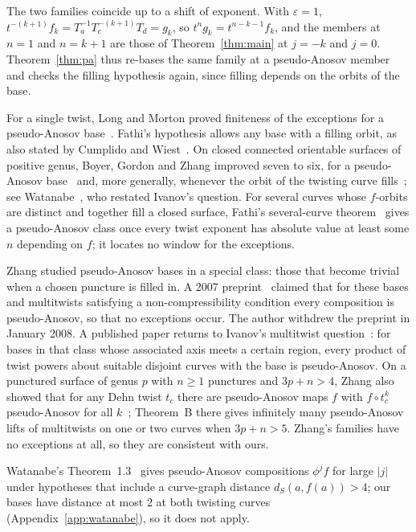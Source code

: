 \documentclass[11pt]{article}
\theoremstyle{remark}
\begin{document}
The two families coincide up to a shift of exponent. With
$\varepsilon=1$, $t^{-(k+1)}f_k=T_a^{-1}T_c^{-(k+1)}T_d=g_k$, so
$t^ng_k=t^{n-k-1}f_k$, and the members at $n=1$ and $n=k+1$ are those of
Theorem~\ref{thm:main} at $j=-k$ and $j=0$. Theorem~\ref{thm:pa} thus
re-bases the same family at a pseudo-Anosov member and checks the filling
hypothesis again, since filling depends on the orbits of the base.

For a single twist, Long and Morton proved finiteness of the exceptions
for a pseudo-Anosov base~\cite[Theorem~A]{LM}. Fathi's hypothesis allows
any base with a filling orbit, as also stated by Cumplido and
Wiest~\cite[Theorem~3]{CW}. On closed connected orientable surfaces of
positive genus, Boyer, Gordon and Zhang improved seven to six, for a
pseudo-Anosov base~\cite[Theorem~1.3]{BGZ} and, more generally, whenever
the orbit of the twisting curve fills~\cite[Theorem~2.6]{BGZ}; see
Watanabe~\cite[\S1.1]{Watanabe}, who restated Ivanov's question. For
several curves whose $f$-orbits are distinct and together fill a closed
surface, Fathi's several-curve theorem~\cite[Theorem~0.2]{Fathi} gives a
pseudo-Anosov class once
every twist exponent has absolute value at least some $n$ depending on
$f$; it locates no window for the exceptions.

Zhang studied pseudo-Anosov bases in a special class: those that become
trivial when a chosen puncture is filled in. A 2007
preprint~\cite[Theorem~2]{Zhang07} claimed that for these bases and
multitwists satisfying a non-compressibility condition every composition
is pseudo-Anosov, so that no exceptions occur. The author withdrew the
preprint in January 2008. A published paper returns to Ivanov's multitwist
question~\cite[pp.~415--416]{Zhang10}: for bases in that class whose associated
axis meets a certain region, every product of twist powers about suitable
disjoint curves with the base is pseudo-Anosov. On a punctured surface of
genus $p$ with $n\ge1$ punctures and $3p+n>4$, Zhang also showed that for
any Dehn twist $t_c$ there are pseudo-Anosov maps $f$ with $f\circ t_c^k$
pseudo-Anosov for all $k$~\cite[Theorem~A and the Remark following
it]{Zhang11}; Theorem~B there gives infinitely many pseudo-Anosov lifts of
multitwists on one or two curves when $3p+n>5$. Zhang's families have no
exceptions at all, so they are consistent with ours.

Watanabe's Theorem~1.3~\cite{Watanabe} gives pseudo-Anosov compositions
$\phi^jf$ for large $|j|$ under hypotheses that include a curve-graph
distance $d_S(a,f(a))>4$; our bases have distance at most $2$ at both
twisting curves (Appendix~\ref{app:watanabe}), so it does not apply.
\end{document}
